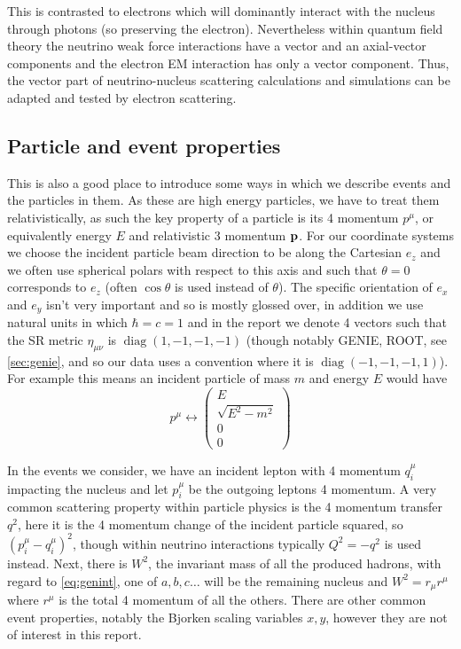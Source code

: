 \documentclass[a4paper,12pt]{article}
\DeclareMathOperator{\diag}{diag}
\begin{document}
This is contrasted to electrons which will dominantly interact with the nucleus through photons (so preserving the electron).
Nevertheless within quantum field theory the neutrino weak force interactions have a vector and an axial-vector components and the electron EM interaction has only a vector component\cite{alvarez-rusoNuSTEC11NeutrinoScattering2018}.
Thus, the vector part of neutrino-nucleus scattering calculations and simulations can be adapted and tested by electron scattering.


\subsection{Particle and event properties}
This is also a good place to introduce some ways in which we describe events and the particles in them.
As these are high energy particles, we have to treat them relativistically, as such the key property of a particle is its 4 momentum $p^\mu$, or equivalently energy $E$ and relativistic 3 momentum $\vb{p}$.
For our coordinate systems we choose the incident particle beam direction to be along the Cartesian $e_z$ and we often use spherical polars with respect to this axis and such that $\theta = 0$ corresponds to $e_z$ (often $\cos{\theta}$ is used instead of $\theta$).
The specific orientation of $e_x$ and $e_y$ isn't very important and so is mostly glossed over, in addition we use natural units in which $\hbar = c = 1$ and in the report we denote 4 vectors such that the SR metric $\eta_{\mu \nu}$ is $\diag(1, -1, -1, -1)$ (though notably GENIE, ROOT, see \cref{sec:genie}, and so our data uses a convention where it is $\diag(-1, -1, -1, 1)$).
For example this means an incident particle of mass $m$ and energy $E$ would have
\begin{equation}
    p^\mu \leftrightarrow \begin{pmatrix} E \\ \sqrt{E^2 - m^2} \\ 0 \\ 0 \end{pmatrix}
\end{equation}

In the events we consider, we have an incident lepton with 4 momentum $q_{i}^\mu$ impacting the nucleus and let $p_i^\mu$ be the outgoing leptons 4 momentum.
A very common scattering property within particle physics is the 4 momentum transfer $q^2$, here it is the 4 momentum change of the incident particle squared, so $(p_i^\mu - q_i^\mu)^2$, though within neutrino interactions typically $Q^2 = -q^2$ is used instead.
Next, there is $W^2$, the invariant mass of all the produced hadrons, with regard to \cref{eq:genint}, one of $a, b, c \ldots$ will be the remaining nucleus and $W^2 = r_\mu r^\mu$ where $r^\mu$ is the total 4 momentum of all the others.
There are other common event properties, notably the Bjorken scaling variables $x, y$, however they are not of interest in this report.
\end{document}
